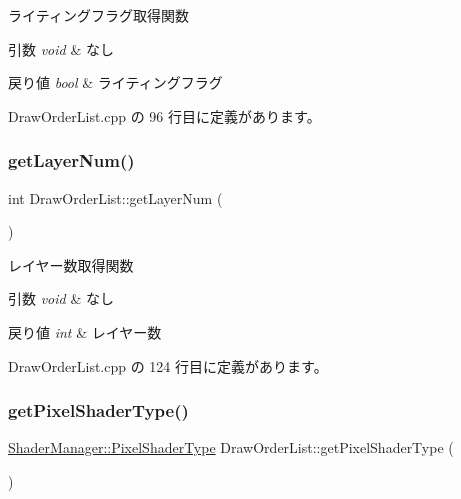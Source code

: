 ライティングフラグ取得関数 


\begin{DoxyParams}{引数}
{\em void} & なし \\
\hline
\end{DoxyParams}

\begin{DoxyRetVals}{戻り値}
{\em bool} & ライティングフラグ \\
\hline
\end{DoxyRetVals}


 Draw\+Order\+List.\+cpp の 96 行目に定義があります。

\mbox{\label{class_draw_order_list_afe5cb8651814f631146c91e6428c0b6d}} 
\subsubsection{\texorpdfstring{get\+Layer\+Num()}{getLayerNum()}}
{\footnotesize\ttfamily int Draw\+Order\+List\+::get\+Layer\+Num (\begin{DoxyParamCaption}{ }\end{DoxyParamCaption})}



レイヤー数取得関数 


\begin{DoxyParams}{引数}
{\em void} & なし \\
\hline
\end{DoxyParams}

\begin{DoxyRetVals}{戻り値}
{\em int} & レイヤー数 \\
\hline
\end{DoxyRetVals}


 Draw\+Order\+List.\+cpp の 124 行目に定義があります。

\mbox{\label{class_draw_order_list_afc56377beda4eabbf20c5115c3a26ef7}} 
\subsubsection{\texorpdfstring{get\+Pixel\+Shader\+Type()}{getPixelShaderType()}}
{\footnotesize\ttfamily \mbox{\hyperlink{class_shader_manager_a7d15d773b3c6a99dd7086c45c8b0be5f}{Shader\+Manager\+::\+Pixel\+Shader\+Type}} Draw\+Order\+List\+::get\+Pixel\+Shader\+Type (\begin{DoxyParamCaption}{ }\end{DoxyParamCaption})}



